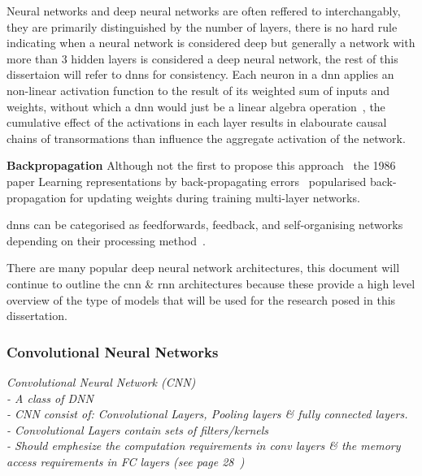 \documentclass[../../D1.tex]{subfiles}
\begin{document}
Neural networks and deep neural networks are often reffered to interchangably, they are primarily distinguished by the number of layers, there is no hard rule indicating when a neural network is considered deep but generally a network with more than 3 hidden layers is considered a deep neural network, the rest of this dissertaion will refer to \acrshort{dnn}s for consistency. 
Each neuron in a \Acrshort{dnn} applies an non-linear activation function to the result of its weighted sum of inputs and weights, without which a \Acrshort{dnn} would just be a linear algebra operation~\autocite{szeEfficientProcessingDeep2017}, the cumulative effect of the activations in each layer results in elabourate causal chains of transormations than influence the aggregate activation of the network.

\textbf{Backpropagation} Although not the first to propose this approach~\autocite{schmidhuberDeepLearningNeural2015} the 1986 paper Learning representations by back-propagating errors~\autocite{rumelhartLearningRepresentationsBackpropagating1986} popularised back-propagation for updating weights during training multi-layer networks.

\Acrshort{dnn}s can be categorised as feedforwards, feedback, and self-organising networks depending on their processing method~\autocite{chenDeepLearningMobile2020}.


There are many popular deep neural network architectures, this document will continue to outline the \Acrshort{cnn} \& \Acrshort{rnn} architectures because these provide a high level overview of the type of models that will be used for the research posed in this dissertation.



\subsubsection{Convolutional Neural Networks}

\emph{Convolutional Neural Network (CNN)\\
    - A class of DNN\\
    - CNN consist of: Convolutional Layers, Pooling layers \& fully connected layers.\\
    - Convolutional Layers contain sets of filters/kernels\\
    - Should emphesize the computation requirements in conv layers \& the memory access requirements in FC layers (see page 28~\autocite{qiuGoingDeeperEmbedded2016})}
\end{document}
